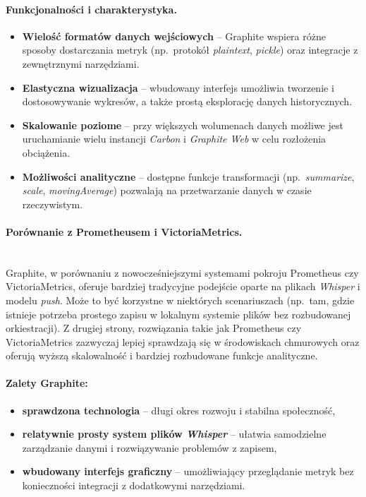 \documentclass{article}
\begin{document}
\paragraph{Funkcjonalności i charakterystyka.}
\begin{itemize}
    \item \textbf{Wielość formatów danych wejściowych} -- Graphite wspiera różne sposoby dostarczania metryk (np.\ protokół \emph{plaintext}, \emph{pickle}) oraz integracje z zewnętrznymi narzędziami.
    \item \textbf{Elastyczna wizualizacja} -- wbudowany interfejs umożliwia tworzenie i dostosowywanie wykresów, a także prostą eksplorację danych historycznych.
    \item \textbf{Skalowanie poziome} -- przy większych wolumenach danych możliwe jest uruchamianie wielu instancji \emph{Carbon} i \emph{Graphite Web} w celu rozłożenia obciążenia.
    \item \textbf{Możliwości analityczne} -- dostępne funkcje transformacji (np.\ \emph{summarize}, \emph{scale}, \emph{movingAverage}) pozwalają na przetwarzanie danych w czasie rzeczywistym.
\end{itemize}

\paragraph{Porównanie z Prometheusem i VictoriaMetrics.}\mbox{}\\
Graphite, w porównaniu z nowocześniejszymi systemami pokroju Prometheus czy VictoriaMetrics, oferuje bardziej tradycyjne podejście oparte na plikach \emph{Whisper} i modelu \emph{push}. Może to być korzystne w niektórych scenariuszach (np.\ tam, gdzie istnieje potrzeba prostego zapisu w lokalnym systemie plików bez rozbudowanej orkiestracji). Z drugiej strony, rozwiązania takie jak Prometheus czy VictoriaMetrics zazwyczaj lepiej sprawdzają się w środowiskach chmurowych oraz oferują wyższą skalowalność i bardziej rozbudowane funkcje analityczne.

\paragraph{Zalety Graphite:}
\begin{itemize}
    \item \textbf{sprawdzona technologia} -- długi okres rozwoju i stabilna społeczność,
    \item \textbf{relatywnie prosty system plików \emph{Whisper}} -- ułatwia samodzielne zarządzanie danymi i rozwiązywanie problemów z zapisem,
    \item \textbf{wbudowany interfejs graficzny} -- umożliwiający przeglądanie metryk bez konieczności integracji z dodatkowymi narzędziami.
\end{itemize}
\end{document}
